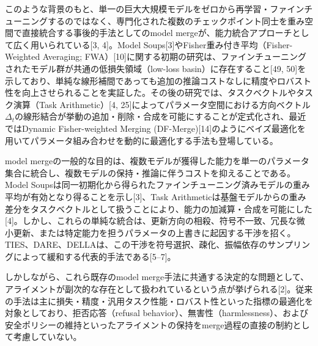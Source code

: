\documentclass{article}
\begin{document}
このような背景のもと、単一の巨大大規模モデルをゼロから再学習・ファインチューニングするのではなく、専門化された複数のチェックポイント同士を重み空間で直接統合する事後的手法としてのmodel mergeが、能力統合アプローチとして広く用いられている[3, 4]。Model Soups[3]やFisher重み付き平均（Fisher-Weighted Averaging; FWA）[10]に関する初期の研究は、ファインチューニングされたモデル群が共通の低損失領域（low-loss basin）に存在すること[49, 50]を示しており、単純な線形補間であっても追加の推論コストなしに精度やロバスト性を向上させられることを実証した。その後の研究では、タスクベクトルやタスク演算（Task Arithmetic）[4, 25]によってパラメータ空間における方向ベクトル$\Delta_t$の線形結合が挙動の追加・削除・合成を可能にすることが定式化され、最近ではDynamic Fisher-weighted Merging (DF-Merge)[14]のようにベイズ最適化を用いてパラメータ組み合わせを動的に最適化する手法も登場している。

model mergeの一般的な目的は、複数モデルが獲得した能力を単一のパラメータ集合に統合し、複数モデルの保持・推論に伴うコストを抑えることである。Model Soupsは同一初期化から得られたファインチューニング済みモデルの重み平均が有効となり得ることを示し[3]、Task Arithmeticは基盤モデルからの重み差分をタスクベクトルとして扱うことにより、能力の加減算・合成を可能にした[4]。しかし、これらの単純な統合は、更新方向の相殺、符号不一致、冗長な微小更新、または特定能力を担うパラメータの上書きに起因する干渉を招く。TIES、DARE、DELLAは、この干渉を符号選択、疎化、振幅依存のサンプリングによって緩和する代表的手法である[5--7]。

しかしながら、これら既存のmodel merge手法に共通する決定的な問題として、アライメントが副次的な存在として扱われているという点が挙げられる[2]。従来の手法は主に損失・精度・汎用タスク性能・ロバスト性といった指標の最適化を対象としており、拒否応答（refusal behavior）、無害性（harmlessness）、および安全ポリシーの維持といったアライメントの保持をmerge過程の直接の制約として考慮していない。
\end{document}
